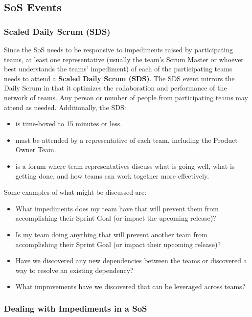 \documentclass[12pt,a4paper,parskip=full]{scrartcl}
\begin{document}
\subsection{SoS Events}

\subsubsection{Scaled Daily Scrum (SDS)}

Since the SoS needs to be responsive to impediments raised by participating teams, at least one representative (usually the team's Scrum Master or whoever best understands the teams' impediment) of each of the participating teams needs to attend a \textbf{Scaled Daily Scrum (SDS)}. The SDS event mirrors the Daily Scrum in that it optimizes the collaboration and performance of the network of teams. Any person or number of people from participating teams may attend as needed. Additionally, the SDS:

\begin{itemize}
	\item is time-boxed to 15 minutes or less.
	\item must be attended by a representative of each team, including the Product Owner Team.
	\item is a forum where team representatives discuss what is going well, what is getting done, and how teams can work together more effectively. 
\end{itemize}
	
Some examples of what might be discussed are:
\begin{itemize}
	\item What impediments does my team have that will prevent them from accomplishing their Sprint Goal (or impact the upcoming release)?
	\item Is my team doing anything that will prevent another team from accomplishing their Sprint Goal (or impact their upcoming release)?
	\item Have we discovered any new dependencies between the teams or discovered a way to resolve an existing dependency?
	\item What improvements have we discovered that can be leveraged across teams?
\end{itemize}

\subsubsection{Dealing with Impediments in a SoS}
\end{document}
